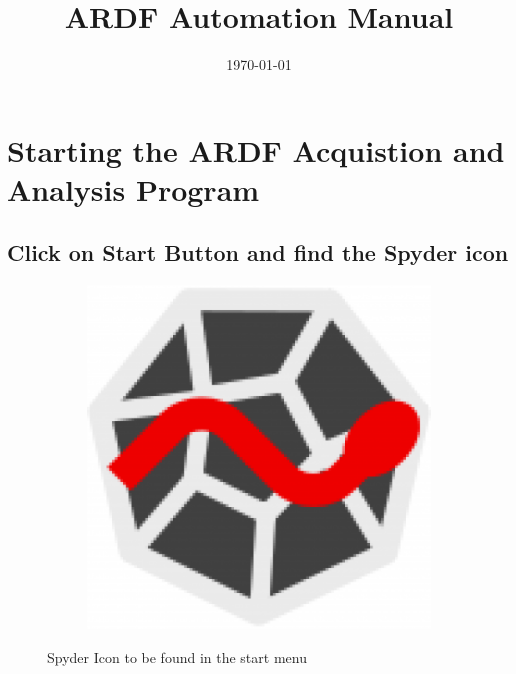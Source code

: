 \documentclass[12pt]{article}
\title{ARDF Automation Manual}
\author{}
\date{\today}
\begin{document}
\maketitle{}

\tableofcontents

\clearpage
\newpage






\section{Starting the ARDF Acquistion and Analysis Program}


\subsection{Click on Start Button and find the Spyder icon}

\begin{figure}[H]
 
    \begin{subfigure}{1\textwidth}
    \includegraphics[scale=0.5]{images/spyder_icon.png} 
    \label{fig:DJp1}
    \end{subfigure}
 \caption{Spyder Icon to be found in the start menu}
\label{fig6}
\end{figure}
\end{document}
